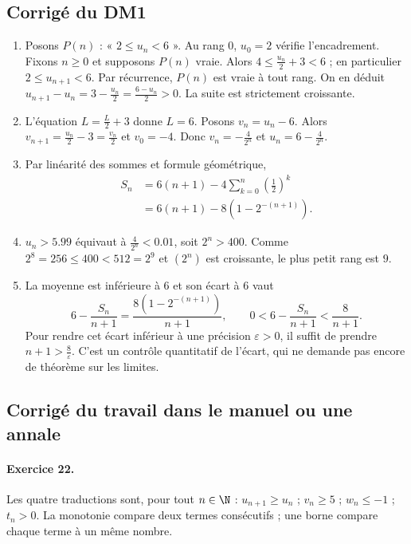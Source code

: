 \subsection{Corrigé du DM1}\begin{enumerate}
\item Posons $P(n)$ : « $2\le u_n<6$ ». Au rang $0$, $u_0=2$ vérifie l'encadrement. Fixons $n\ge0$ et supposons $P(n)$ vraie. Alors $4\le \frac{u_n}{2}+3<6$ ; en particulier $2\le u_{n+1}<6$. Par récurrence, $P(n)$ est vraie à tout rang. On en déduit $u_{n+1}-u_n=3-\frac{u_n}{2}=\frac{6-u_n}{2}>0$. La suite est strictement croissante.
\item L'équation $L=\frac{L}{2}+3$ donne $L=6$. Posons $v_n=u_n-6$. Alors $v_{n+1}=\frac{u_n}{2}-3=\frac{v_n}{2}$ et $v_0=-4$. Donc $v_n=-\frac{4}{2^n}$ et $u_n=6-\frac{4}{2^n}$.
\item Par linéarité des sommes et formule géométrique,
\[\begin{aligned}S_n&=6(n+1)-4\sum_{k=0}^n(\frac{1}{2})^k\\&=6(n+1)-8(1-2^{-(n+1)}).\end{aligned}\]
\item $u_n>\num{5,99}$ équivaut à $\frac{4}{2^n}<\num{0,01}$, soit $2^n>400$. Comme $2^8=256\le400<512=2^9$ et $(2^n)$ est croissante, le plus petit rang est $9$.
\item La moyenne est inférieure à $6$ et son écart à $6$ vaut
\[6-\frac{S_n}{n+1}=\frac{8(1-2^{-(n+1)})}{n+1},\qquad 0<6-\frac{S_n}{n+1}<\frac8{n+1}.\]
Pour rendre cet écart inférieur à une précision $\varepsilon>0$, il suffit de prendre $n+1>\frac{8}{\varepsilon}$. C'est un contrôle quantitatif de l'écart, qui ne demande pas encore de théorème sur les limites.
\end{enumerate}

\subsection{Corrigé du travail dans le manuel ou une annale}\paragraph{Exercice 22.} Les quatre traductions sont, pour tout $n\in\N$ : $u_{n+1}\ge u_n$ ; $v_n\ge5$ ; $w_n\le-1$ ; $t_n>0$. La monotonie compare deux termes consécutifs ; une borne compare chaque terme à un même nombre.
